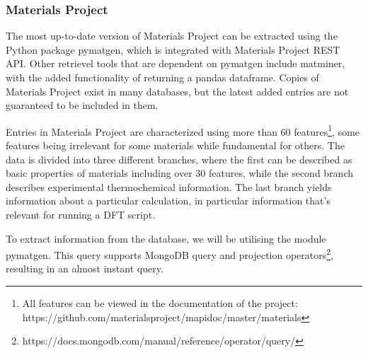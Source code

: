 

\subsubsection{Materials Project}
\label{ssec:materialsproject}

The most up-to-date version of Materials Project can be extracted using the Python package pymatgen, which is integrated with Materials Project REST API. Other retrievel tools that are dependent on pymatgen include matminer, with the added functionality of returning a pandas dataframe. Copies of Materials Project exist in many databases, but the latest added entries are not guaranteed to be included in them. %

Entries in Materials Project are characterized using more than 60 features\footnote{All features can be viewed in the documentation of the project: https://github.com/materialsproject/mapidoc/master/materials}, some features being irrelevant for some materials while fundamental for others. The data is divided into three different branches, where the first can be described as basic properties of materials including over $30$ features, while the second branch describes experimental thermochemical information. The last branch yields information about a particular calculation, in particular information that's relevant for running a DFT script.

To extract information from the database, we will be utilising the module pymatgen. This query supports MongoDB query and projection operators\footnote{https://docs.mongodb.com/manual/reference/operator/query/}, resulting in an almost instant query.

